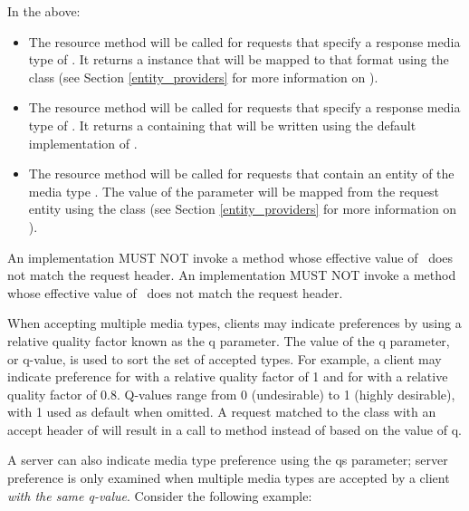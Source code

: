 In the above:
\begin{itemize}
\item The  resource method will be called for  requests that specify a response media type of . It returns a  instance that will be mapped to that format using the  class (see Section \ref{entity_providers} for more information on \MsgWrite).
\item The  resource method will be called for  requests that specify a response media type of . It returns a  containing  that will be written using the default implementation of .
\item The  resource method will be called for  requests that contain an entity of the media type . The value of the  parameter will be mapped from the request entity using the  class (see Section \ref{entity_providers} for more information on \MsgRead).
\end{itemize}

An implementation MUST NOT invoke a method whose effective value of \Produces\ does not match the request  header. An implementation MUST NOT invoke a method whose effective value of \Consumes\ does not match the request  header.

When accepting multiple media types, clients may indicate preferences by using a relative quality factor known as the q parameter. The value of the q parameter, or q-value, is used to sort the set of accepted types. For example, a client may indicate preference for  with a relative quality factor of 1 and for  with a relative quality factor of 0.8. Q-values range from 0 (undesirable) to 1 (highly desirable), with 1 used as default when omitted. A  request matched to the  class with an accept header of  will result in a call to method  instead of  based on the value of q. 

A server can also indicate media type preference using the qs parameter; server preference is only examined when multiple media types are accepted by a client {\em with the same q-value}. Consider the following example:

